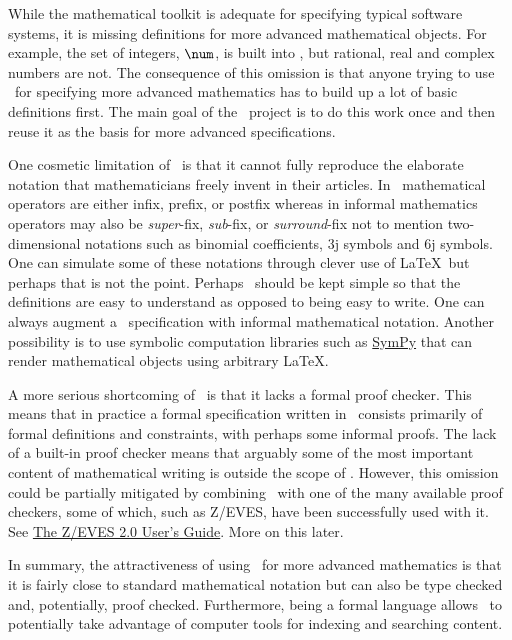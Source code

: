 \documentclass{amsart}
\begin{document}
While the mathematical toolkit is adequate for specifying typical software systems, it is missing definitions for more advanced
mathematical objects.
For example, the set of integers, $\num$, is built into \ZN, but rational, real and complex numbers are not.
The consequence of this omission is that anyone trying to use \ZN\ for specifying more advanced mathematics has to build up
a lot of basic definitions first.
The main goal of the \mathz\ project is to do this work once and then reuse it as the basis for more advanced specifications.

One cosmetic limitation of \ZN\ is that it cannot fully reproduce the elaborate notation that mathematicians freely invent in their articles.
In \ZN\ mathematical operators are either infix, prefix, or postfix whereas in informal mathematics operators may also be 
\emph{super}-fix, \emph{sub}-fix, or \emph{surround}-fix not to mention two-dimensional notations such as binomial coefficients,
3j symbols and 6j symbols.
One can simulate some of these notations through clever use of \LaTeX\ but perhaps that is not the point.
Perhaps \ZN\ should be kept simple so that the definitions are easy to understand as opposed to being easy to write.
One can always augment a \ZN\ specification with informal mathematical notation.
Another possibility is to use symbolic computation libraries such as \href{https://www.sympy.org}{SymPy} that can render mathematical objects using arbitrary \LaTeX.

A more serious shortcoming of \ZN\ is that it lacks a formal proof checker.
This means that in practice a formal specification written in \ZN\ consists primarily of formal definitions and constraints, with perhaps some
informal proofs.
The lack of a built-in proof checker means that arguably some of the most important content of mathematical writing is outside the scope of
\ZN.
However, this omission could be partially mitigated by combining \ZN\ with one of the many available proof checkers, some of which,
such as Z/EVES, have been successfully used with it. 
See \href{https://www.csm.ornl.gov/~sheldon/bucket/ze_userguide.pdf}{The Z/EVES 2.0 User's Guide}.
More on this later.

In summary, the attractiveness of using \ZN\ for more advanced mathematics is that it is fairly close to standard mathematical notation but can also
be type checked and, potentially, proof checked.
Furthermore, being a formal language allows \ZN\ to potentially take advantage of computer tools for indexing and searching content.
\end{document}
